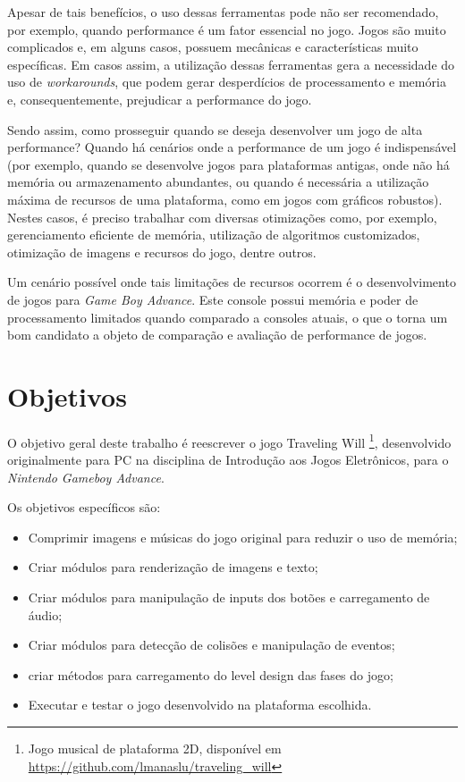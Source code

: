 Apesar de tais benefícios, o uso dessas ferramentas pode não ser recomendado, por exemplo, quando performance é um fator essencial no jogo. Jogos são muito complicados e, em alguns casos, possuem mecânicas e características muito específicas. Em casos assim, a utilização dessas ferramentas gera a necessidade do uso de \textit{workarounds}, que podem gerar desperdícios de processamento e memória e, consequentemente, prejudicar a performance do jogo.

Sendo assim, como prosseguir quando se deseja desenvolver um jogo de alta performance? Quando há cenários onde a performance de um jogo é indispensável (por exemplo, quando se desenvolve jogos para plataformas antigas, onde não há memória ou armazenamento abundantes, ou quando é necessária a utilização máxima de recursos de uma plataforma, como em jogos com gráficos robustos). Nestes casos, é preciso trabalhar com diversas otimizações como, por exemplo, gerenciamento eficiente de memória, utilização de algoritmos customizados, otimização de imagens e recursos do jogo, dentre outros.

Um cenário possível onde tais limitações de recursos ocorrem é o desenvolvimento de jogos para \textit{Game Boy Advance}. Este console possui memória e poder de processamento limitados quando comparado a consoles atuais, o que o torna um bom candidato a objeto de comparação e avaliação de performance de jogos.

\section*{Objetivos}

O objetivo geral deste trabalho é reescrever o jogo Traveling Will \footnote{Jogo musical de plataforma 2D, disponível em \url{https://github.com/lmanaslu/traveling_will}}, desenvolvido originalmente para PC na disciplina de Introdução aos Jogos Eletrônicos, para o \textit{Nintendo Gameboy Advance}.

Os objetivos específicos são:

\begin{itemize}
\item Comprimir imagens e músicas do jogo original para reduzir o uso de memória;
\item Criar módulos para renderização de imagens e texto;
\item Criar módulos para manipulação de inputs dos botões e carregamento de áudio;
\item Criar módulos para detecção de colisões e manipulação de eventos;
\item criar métodos para carregamento do level design das fases do jogo;
\item Executar e testar o jogo desenvolvido na plataforma escolhida.
\end{itemize}

